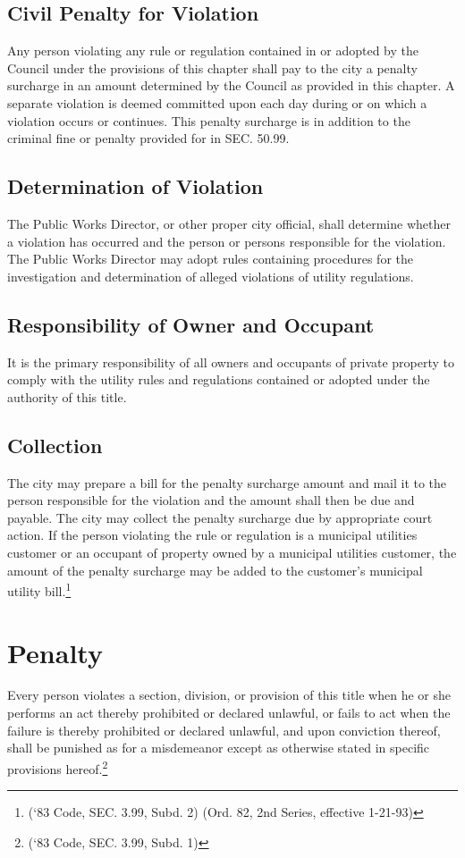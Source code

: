\subsection{Civil Penalty for Violation}
Any person violating any rule or regulation contained in or adopted by the Council under the provisions of this chapter shall pay to the city a penalty surcharge in an amount determined by the Council as provided in this chapter.  A separate violation is deemed committed upon each day during or on which a violation occurs or continues.  This penalty surcharge is in addition to the criminal fine or penalty provided for in SEC. 50.99.
\subsection{Determination of Violation}
The Public Works Director, or other proper city official, shall determine whether a violation has occurred and the person or persons responsible for the violation.  The Public Works Director may adopt rules containing procedures for the investigation and determination of alleged violations of utility regulations.
\subsection{Responsibility of Owner and Occupant}
It is the primary responsibility of all owners and occupants of private property to comply with the utility rules and regulations contained or adopted under the authority of this title.
\subsection{Collection}
The city may prepare a bill for the penalty surcharge amount and mail it to the person responsible for the violation and the amount shall then be due and payable.  The city may collect the penalty surcharge due by appropriate court action.  If the person violating the rule or regulation is a municipal utilities customer or an occupant of property owned by a municipal utilities customer, the amount of the penalty surcharge may be added to the customer’s municipal utility bill.\footnote{(‘83 Code, SEC. 3.99, Subd. 2) (Ord. 82, 2nd Series, effective 1-21-93)}
\section{Penalty}
Every person violates a section, division, or provision of this title when he or she performs an act thereby prohibited or declared unlawful, or fails to act when the failure is thereby prohibited or declared unlawful, and upon conviction thereof, shall be punished as for a misdemeanor except as otherwise stated in specific provisions hereof.\footnote{(‘83 Code, SEC. 3.99, Subd. 1)}
